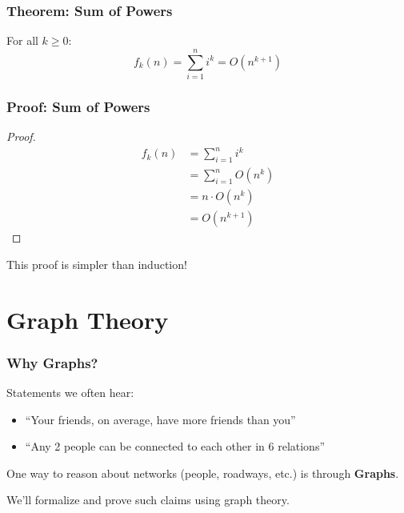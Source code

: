 \documentclass{beamer}
\begin{document}
\begin{frame}
  \frametitle{Theorem: Sum of Powers}
  
  \begin{theorem}
    For all $k \geq 0$:
    $$f_k(n) = \sum_{i=1}^n i^k = O(n^{k+1})$$
  \end{theorem}
  
\end{frame}

\begin{frame}
  \frametitle{Proof: Sum of Powers}
  
    \begin{proof}
    \begin{align*}
      f_k(n) &= \sum_{i=1}^n i^k \\
      &= \sum_{i=1}^n O(n^k) \\
      &= n \cdot O(n^k) \\
      &= O(n^{k+1})
    \end{align*}
  \end{proof}

   This proof is simpler than induction!
  
\end{frame}


\section{Graph Theory}

\begin{frame}
  \frametitle{Why Graphs?}
  
  Statements we often hear:
  \begin{itemize}
    \item ``Your friends, on average, have more friends than you''
    \item ``Any 2 people can be connected to each other in 6 relations''
  \end{itemize}
  
  \vspace{0.3cm}
  
  One way to reason about networks (people, roadways, etc.) is through \textbf{Graphs}.
  
  \vspace{0.3cm}
  
  We'll formalize and prove such claims using graph theory.
\end{frame}
\end{document}
